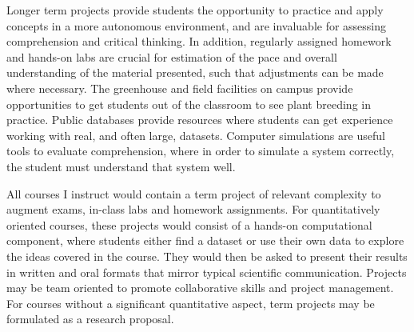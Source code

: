 \documentclass[11pt]{article}
\begin{document}
Longer term projects provide students the opportunity to practice and apply concepts in a more autonomous environment, and are invaluable for assessing comprehension and critical thinking. In addition, regularly assigned homework and hands-on labs are crucial for estimation of the pace and overall understanding of the material presented, such that adjustments can be made where necessary. The greenhouse and field facilities on campus provide opportunities to get students out of the classroom to see plant breeding in practice. Public databases provide resources where students can get experience working with real, and often large, datasets. Computer simulations are useful tools to evaluate comprehension, where in order to simulate a system correctly, the student must understand that system well.





All courses I instruct would contain a term project of relevant complexity to augment exams, in-class labs and homework assignments. For quantitatively oriented courses, these projects would consist of a hands-on computational component, where students either find a dataset or use their own data to explore the ideas covered in the course. They would then be asked to present their results in written and oral formats that mirror typical scientific communication. Projects may be team oriented to promote collaborative skills and project management. For courses without a significant quantitative aspect, term projects may be formulated as a research proposal.%
\end{document}
